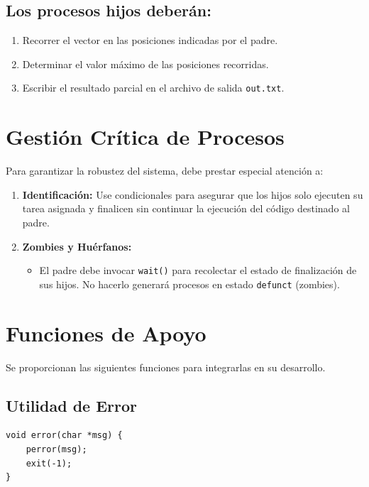 \documentclass[12pt,a4paper]{article}
\begin{document}
\subsection*{Los procesos hijos deberán:}
\begin{enumerate}
    \item Recorrer el vector en las posiciones indicadas por el padre.
    \item Determinar el valor máximo de las posiciones recorridas.
    \item Escribir el resultado parcial en el archivo de salida \texttt{out.txt}.
\end{enumerate}
\newpage

\section*{Gestión Crítica de Procesos}
Para garantizar la robustez del sistema, debe prestar especial atención a:
\begin{enumerate}
    \item \textbf{Identificación:} Use condicionales para asegurar que los hijos solo ejecuten su tarea asignada y finalicen sin continuar la ejecución del código destinado al padre.
    \item \textbf{Zombies y Huérfanos:} 
    \begin{itemize}
        \item El padre debe invocar \texttt{wait()} para recolectar el estado de finalización de sus hijos. No hacerlo generará procesos en estado \texttt{defunct} (zombies).
    \end{itemize}
\end{enumerate}

\section*{Funciones de Apoyo}
Se proporcionan las siguientes funciones para integrarlas en su desarrollo.

\subsection*{Utilidad de Error}
\begin{lstlisting}
void error(char *msg) {
    perror(msg);
    exit(-1);
}
\end{lstlisting}
\end{document}
